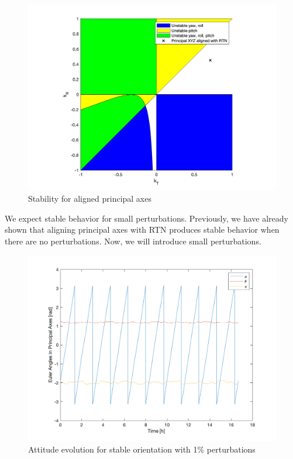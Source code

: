 \begin{figure}[H]
\centering
\includegraphics[scale=0.6]{Images/ps5_problem1c.png}
\caption{Stability for aligned principal axes}
\label{fig:ps5_problem1c}
\end{figure}

We expect stable behavior for small perturbations. Previously, we have already shown that aligning principal axes with RTN produces stable behavior when there are no perturbations. Now, we will introduce small perturbations.

\begin{figure}[H]
\centering
\includegraphics[scale=0.6]{Images/ps5_problem1c_angle.png}
\caption{Attitude evolution for stable orientation with 1\% perturbations}
\label{fig:ps5_problem1c_angle}
\end{figure}

